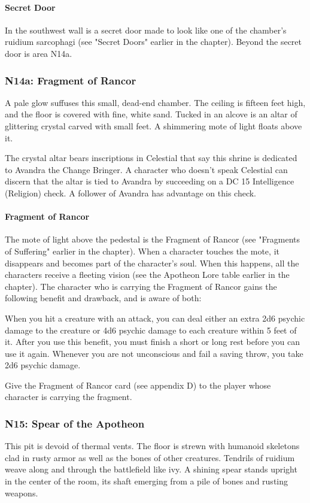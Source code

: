 \documentclass[10pt,a4,twoside,twocolumn,openany,nodeprecatedcode]{dndbook}
\begin{document}
\paragraph{Secret Door}
In the southwest wall is a secret door made to look like one of the chamber's ruidium sarcophagi (see "Secret Doors" earlier in the chapter). Beyond the secret door is area N14a.
\subsubsection{N14a: Fragment of Rancor}
\begin{DndReadAloud}{}
A pale glow suffuses this small, dead-end chamber. The ceiling is fifteen feet high, and the floor is covered with fine, white sand. Tucked in an alcove is an altar of glittering crystal carved with small feet. A shimmering mote of light floats above it.
\end{DndReadAloud}

The crystal altar bears inscriptions in Celestial that say this shrine is dedicated to Avandra the Change Bringer. A character who doesn't speak Celestial can discern that the altar is tied to Avandra by succeeding on a DC 15 Intelligence (Religion) check. A follower of Avandra has advantage on this check.
\paragraph{Fragment of Rancor}
The mote of light above the pedestal is the Fragment of Rancor (see "Fragments of Suffering" earlier in the chapter). When a character touches the mote, it disappears and becomes part of the character's soul. When this happens, all the characters receive a fleeting vision (see the Apotheon Lore table earlier in the chapter).
The character who is carrying the Fragment of Rancor gains the following benefit and drawback, and is aware of both:
\begin{DndComment}{}
{{When you hit a creature with an attack, you can deal either an extra 2d6 psychic damage to the creature or 4d6 psychic damage to each creature within 5 feet of it. After you use this benefit, you must finish a short or long rest before you can use it again.}}
{{Whenever you are not unconscious and fail a saving throw, you take 2d6 psychic damage.}}
\end{DndComment}

Give the Fragment of Rancor card (see appendix D) to the player whose character is carrying the fragment.
\subsubsection{N15: Spear of the Apotheon}
\begin{DndReadAloud}{}
This pit is devoid of thermal vents. The floor is strewn with humanoid skeletons clad in rusty armor as well as the bones of other creatures. Tendrils of ruidium weave along and through the battlefield like ivy. A shining spear stands upright in the center of the room, its shaft emerging from a pile of bones and rusting weapons.
\end{DndReadAloud}
\end{document}
